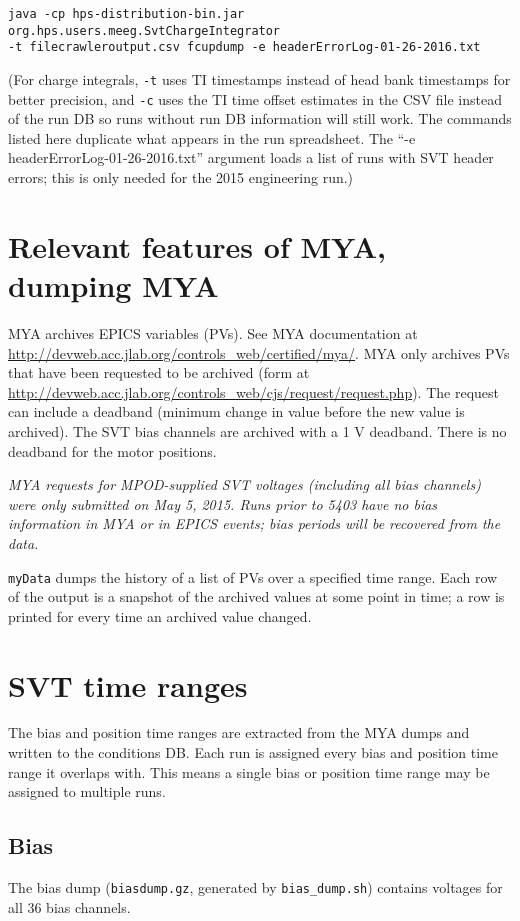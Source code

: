 \documentclass[aps,amsmath,amssymb,notitlepage,10pt,onecolumn]{revtex4-1}
\begin{document}
\texttt{java -cp hps-distribution-bin.jar org.hps.users.meeg.SvtChargeIntegrator\\ -t filecrawleroutput.csv fcupdump -e headerErrorLog-01-26-2016.txt}

(For charge integrals, \texttt{-t} uses TI timestamps instead of head bank timestamps for better precision, and \texttt{-c} uses the TI time offset estimates in the CSV file instead of the run DB so runs without run DB information will still work.
The commands listed here duplicate what appears in the run spreadsheet.
The ``-e headerErrorLog-01-26-2016.txt'' argument loads a list of runs with SVT header errors; this is only needed for the 2015 engineering run.)

\section{Relevant features of MYA, dumping MYA}
MYA archives EPICS variables (PVs).
See MYA documentation at \url{http://devweb.acc.jlab.org/controls_web/certified/mya/}.
MYA only archives PVs that have been requested to be archived (form at \url{http://devweb.acc.jlab.org/controls_web/cjs/request/request.php}).
The request can include a deadband (minimum change in value before the new value is archived).
The SVT bias channels are archived with a 1 V deadband.
There is no deadband for the motor positions.

\emph{MYA requests for MPOD-supplied SVT voltages (including all bias channels) were only submitted on May 5, 2015. Runs prior to 5403 have no bias information in MYA or in EPICS events; bias periods will be recovered from the data.}

\texttt{myData} dumps the history of a list of PVs over a specified time range.
Each row of the output is a snapshot of the archived values at some point in time; a row is printed for every time an archived value changed.

\section{SVT time ranges}
The bias and position time ranges are extracted from the MYA dumps and written to the conditions DB.
Each run is assigned every bias and position time range it overlaps with.
This means a single bias or position time range may be assigned to multiple runs.

\subsection{Bias}
The bias dump (\texttt{biasdump.gz}, generated by \texttt{bias\_dump.sh}) contains voltages for all 36 bias channels.
\end{document}
